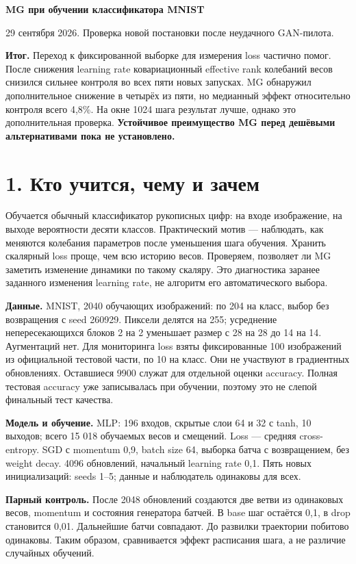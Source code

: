 \documentclass[10pt,a4paper]{article}
\begin{document}
{\Large\bfseries MG при обучении классификатора MNIST}\par\medskip

29 сентября 2026. Проверка новой постановки после неудачного GAN-пилота.

\textbf{Итог.} Переход к фиксированной выборке для измерения loss частично помог. После снижения learning rate ковариационный effective rank колебаний весов снизился сильнее контроля во всех пяти новых запусках. MG обнаружил дополнительное снижение в четырёх из пяти, но медианный эффект относительно контроля всего 4,8\%. На окне 1024 шага результат лучше, однако это дополнительная проверка. \textbf{Устойчивое преимущество MG перед дешёвыми альтернативами пока не установлено.}

\section*{1. Кто учится, чему и зачем}

Обучается обычный классификатор рукописных цифр: на входе изображение, на выходе вероятности десяти классов. Практический мотив --- наблюдать, как меняются колебания параметров после уменьшения шага обучения. Хранить скалярный loss проще, чем всю историю весов. Проверяем, позволяет ли MG заметить изменение динамики по такому скаляру. Это диагностика заранее заданного изменения learning rate, не алгоритм его автоматического выбора.

\textbf{Данные.} MNIST, 2040 обучающих изображений: по 204 на класс, выбор без возвращения с seed 260929. Пиксели делятся на 255; усреднение непересекающихся блоков 2 на 2 уменьшает размер с 28 на 28 до 14 на 14. Аугментаций нет. Для мониторинга loss взяты фиксированные 100 изображений из официальной тестовой части, по 10 на класс. Они не участвуют в градиентных обновлениях. Оставшиеся 9900 служат для отдельной оценки accuracy. Полная тестовая accuracy уже записывалась при обучении, поэтому это не слепой финальный тест качества.

\textbf{Модель и обучение.} MLP: 196 входов, скрытые слои 64 и 32 с tanh, 10 выходов; всего 15 018 обучаемых весов и смещений. Loss --- средняя cross-entropy. SGD с momentum 0,9, batch size 64, выборка батча с возвращением, без weight decay. 4096 обновлений, начальный learning rate 0,1. Пять новых инициализаций: seeds 1--5; данные и наблюдатель одинаковы для всех.

\textbf{Парный контроль.} После 2048 обновлений создаются две ветви из одинаковых весов, momentum и состояния генератора батчей. В base шаг остаётся 0,1, в drop становится 0,01. Дальнейшие батчи совпадают. До развилки траектории побитово одинаковы. Таким образом, сравнивается эффект расписания шага, а не различие случайных обучений.
\end{document}
